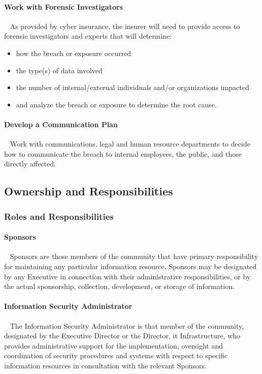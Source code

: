 \paragraph*{Work with Forensic Investigators}~\newline{}
As provided by \OrganizationName{} cyber insurance, the insurer will need to provide access to forensic investigators and experts that will determine:
\begin{itemize}
\item
how the breach or exposure occurred
\item
the type(s) of data involved
\item
the number of internal/external individuals and/or organizations impacted
\item
and analyze the breach or exposure to determine the root cause.
\end{itemize}

\paragraph*{Develop a Communication Plan}~\newline{}
Work with \OrganizationName{} communications, legal and human resource departments to decide how to communicate the breach to internal employees, the public, and those directly affected.

\subsection{Ownership and Responsibilities}
\subsubsection{Roles and Responsibilities}
\paragraph*{Sponsors}~\newline{}
Sponsors are those members of the \OrganizationName{} community that have primary responsibility for maintaining any particular information resource.  
Sponsors may be designated by any \OrganizationName{} Executive in connection with their administrative responsibilities, or by the actual sponsorship, collection, development, or storage of information.
\paragraph*{Information Security Administrator}~\newline{}
The Information Security Administrator is that member of the \OrganizationName{} community, designated by the Executive Director or the Director, \gls{it} Infrastructure, who provides administrative support for the implementation, oversight and coordination of security procedures and systems with respect to specific information resources in consultation with the relevant Sponsors.
